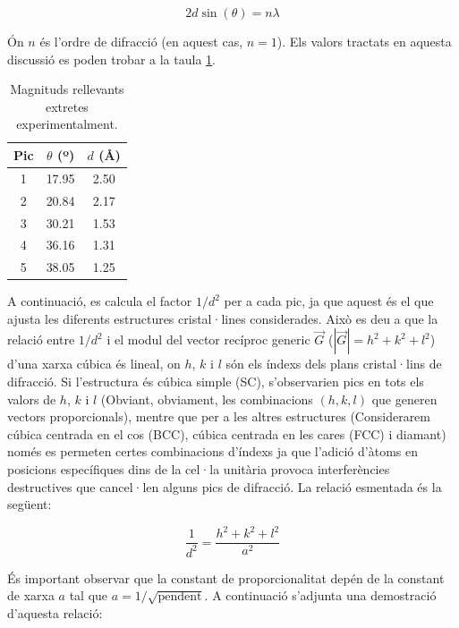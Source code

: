 \documentclass[a4paper, 11pt]{article}
\begin{document}
\begin{equation}
    2d\sin(\theta) = n\lambda
\end{equation}

\noindent Ón $n$ és l'ordre de difracció (en aquest cas, $n=1$). Els valors tractats en aquesta discussió es poden trobar a la taula \ref{tab:valors}.
\vspace{15mm}

\begin{table}[h!]
    \centering
    \begin{tabular}{|c|c|c|}
        \hline
        Pic & $\theta$ (º) & $d$ (\AA) \\
        \hline
        1 & 17.95 & 2.50 \\
        2 & 20.84 & 2.17 \\
        3 & 30.21 & 1.53 \\
        4 & 36.16 & 1.31 \\
        5 & 38.05 & 1.25 \\
        \hline
    \end{tabular}
    \caption{Magnituds rellevants extretes experimentalment.}
    \label{tab:valors}
\end{table}

\noindent A continuació, es calcula el factor $1/d^2$ per a cada pic, ja que aquest és el que ajusta les diferents estructures cristal·lines considerades. Això es deu a que la relació entre $1/d^2$ i el modul del vector recíproc generic $\vec{G}$ ($|\vec{G}| = h^2 + k^2 + l^2$) d'una xarxa cúbica és lineal, on $h$, $k$ i $l$ són els índexs dels plans cristal·lins de difracció. Si l'estructura és cúbica simple (SC), s'observarien pics en tots els valors de $h$, $k$ i $l$ (Obviant, obviament, les combinacions $(h,k,l)$ que generen vectors proporcionals), mentre que per a les altres estructures (Considerarem cúbica centrada en el cos (BCC), cúbica centrada en les cares (FCC) i diamant) només es permeten certes combinacions d'índexs ja que l'adició d'àtoms en posicions específiques dins de la cel·la unitària provoca interferències destructives que cancel·len alguns pics de difracció. La relació esmentada és la següent:

\begin{equation}
    \frac{1}{d^2} = \frac{h^2 + k^2 + l^2}{a^2}
\end{equation}

\noindent És important observar que la constant de proporcionalitat depén de la constant de xarxa $a$ tal que $a = 1/\sqrt{\text{pendent}}$. A continuació s'adjunta una demostració d'aquesta relació:

\end{document}
